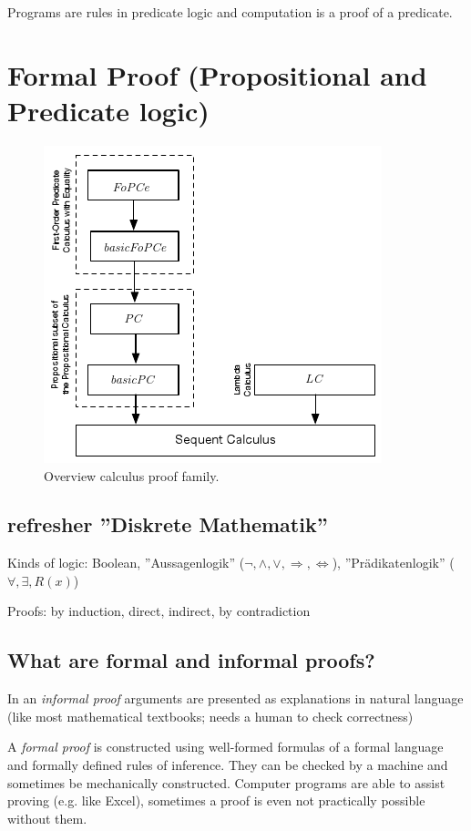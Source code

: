 Programs are rules in predicate logic and computation is a proof of a predicate.



\section{Formal Proof (Propositional and Predicate logic)}

\begin{figure}
	\centering
	\includegraphics[width=0.7\linewidth]{images/sequent_calculus_overview}
	\caption{Overview calculus proof family.}
	\label{fig:sequentcalculusoverview}
\end{figure}

\subsection{refresher ''Diskrete Mathematik''}
Kinds of logic: Boolean, ''Aussagenlogik'' ($\neg, \wedge, \vee,  \Rightarrow, \Leftrightarrow$), ''Prädikatenlogik'' ($\forall,\exists, R(x)$)

Proofs: by induction, direct, indirect, by contradiction

\subsection{What are formal and informal proofs?}
In an \emph{informal proof} arguments are presented as explanations in natural language (like most mathematical textbooks; needs a human to check correctness)

A \emph{formal proof} is constructed using well-formed formulas of a formal language and formally defined rules of inference.
 They can be checked by a machine and sometimes be mechanically constructed. Computer programs are able to assist proving (e.g. like Excel), sometimes a proof is even not practically possible without them.


